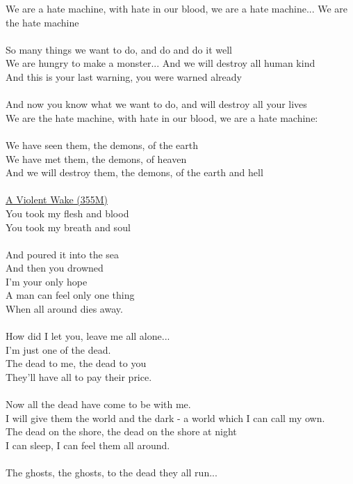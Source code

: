 \documentclass[11pt]{article}
\begin{document}
We are a hate machine, with hate in our blood, we are a hate machine... We are the hate machine\\
\\
So many things we want to do, and do and do it well\\
We are hungry to make a monster... And we will destroy all human kind\\
And this is your last warning, you were warned already\\
\\
And now you know what we want to do, and will destroy all your lives\\
We are the hate machine, with hate in our blood, we are a hate machine:\\
\\
We have seen them, the demons, of the earth\\
We have met them, the demons, of heaven\\
And we will destroy them, the demons, of the earth and hell\\
\\
\underline{A Violent Wake (355M)}\\
You took my flesh and blood\\
You took my breath and soul\\
\\
And poured it into the sea\\
And then you drowned\\
I'm your only hope\\
A man can feel only one thing\\
When all around dies away.\\
\\
How did I let you, leave me all alone...\\
I'm just one of the dead.\\
The dead to me, the dead to you\\
They'll have all to pay their price.\\
\\
Now all the dead have come to be with me.\\
I will give them the world and the dark - a world which I can call my own.\\
The dead on the shore, the dead on the shore at night\\
I can sleep, I can feel them all around.\\
\\
The ghosts, the ghosts, to the dead they all run...\\
\end{document}
